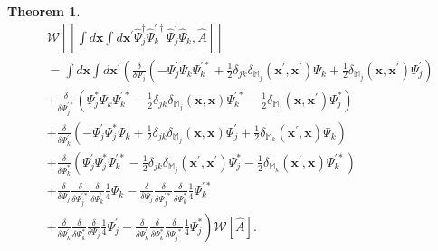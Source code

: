 \documentclass[12pt,aip,jmp,amssymb,amsmath]{revtex4-1}
\newtheorem{theorem}{Theorem}
\begin{document}
\begin{theorem}
\label{thm:transformations:w-commutator2}
    \begin{equation*}\begin{split}
        & \mathcal{W} \left[
            [
                \int d\boldsymbol{x} \int d\boldsymbol{x}^\prime
                \hat{\Psi}_j^\dagger \hat{\Psi}_k^{\prime\dagger} \hat{\Psi}_j^\prime \hat{\Psi}_k,
                \hat{A}
            ]
        \right] \\
        & = \int d\boldsymbol{x} \int d\boldsymbol{x}^\prime \left(
            \frac{\delta}{\delta \Psi_j} \left(
                - \Psi_j^\prime \Psi_k \Psi_k^{\prime*}
                + \frac{1}{2} \delta_{jk} \delta_{\mathbb{M}_j}(\boldsymbol{x}^\prime, \boldsymbol{x}^\prime) \Psi_k
                + \frac{1}{2} \delta_{\mathbb{M}_j}(\boldsymbol{x}, \boldsymbol{x}^\prime) \Psi_j^\prime
            \right) \right . \\
        &   \left. + \frac{\delta}{\delta \Psi_j^{\prime*}} \left(
                \Psi_j^* \Psi_k \Psi_k^{\prime*}
                - \frac{1}{2} \delta_{jk} \delta_{\mathbb{M}_j}(\boldsymbol{x}, \boldsymbol{x}) \Psi_k^{\prime*}
                - \frac{1}{2} \delta_{\mathbb{M}_j}(\boldsymbol{x}, \boldsymbol{x}^\prime) \Psi_j^*
            \right) \right. \\
        &   \left. + \frac{\delta}{\delta \Psi_k^\prime} \left(
                - \Psi_j^\prime \Psi_j^* \Psi_k
                + \frac{1}{2} \delta_{jk} \delta_{\mathbb{M}_j}(\boldsymbol{x}, \boldsymbol{x}) \Psi_j^\prime
                + \frac{1}{2} \delta_{\mathbb{M}_k}(\boldsymbol{x}^\prime, \boldsymbol{x}) \Psi_k
            \right) \right .\\
        &   \left. + \frac{\delta}{\delta \Psi_k^*} \left(
                \Psi_j^\prime \Psi_j^* \Psi_k^{\prime*}
                - \frac{1}{2} \delta_{jk} \delta_{\mathbb{M}_j}(\boldsymbol{x}^\prime, \boldsymbol{x}^\prime) \Psi_j^*
                - \frac{1}{2} \delta_{\mathbb{M}_k}(\boldsymbol{x}^\prime, \boldsymbol{x}) \Psi_k^{\prime*}
            \right) \right. \\
        &   \left.
                + \frac{\delta}{\delta \Psi_j}
                \frac{\delta}{\delta \Psi_j^{\prime*}}
                \frac{\delta}{\delta \Psi_k^\prime}
                \frac{1}{4} \Psi_k
                - \frac{\delta}{\delta \Psi_j}
                \frac{\delta}{\delta \Psi_j^{\prime*}}
                \frac{\delta}{\delta \Psi_k^*}
                \frac{1}{4} \Psi_k^{\prime*}
            \right. \\
        &   \left.
                + \frac{\delta}{\delta \Psi_k^\prime}
                \frac{\delta}{\delta \Psi_k^*}
                \frac{\delta}{\delta \Psi_j}
                \frac{1}{4} \Psi_j^\prime
                - \frac{\delta}{\delta \Psi_k^\prime}
                \frac{\delta}{\delta \Psi_k^*}
                \frac{\delta}{\delta \Psi_j^{\prime*}}
                \frac{1}{4} \Psi_j^*
        \right) \mathcal{W}[\hat{A}].
    \end{split}\end{equation*}
\end{theorem}
\end{document}
